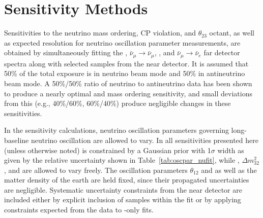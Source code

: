 \section{Sensitivity Methods}
\label{sec:physics-lbnosc-sens}




Sensitivities to the neutrino mass ordering, CP violation, and $\theta_{23}$ octant, as well as expected resolution for neutrino oscillation parameter measurements, are obtained by simultaneously fitting the \numutonumu, $\bar{\nu}_\mu \rightarrow \bar{\nu}_\mu$, \numutonue, and $\bar{\nu}_\mu \rightarrow \bar{\nu}_e$ far detector spectra along with selected samples from the near detector.  It is assumed that 50\% of the total exposure is in neutrino beam mode and 50\% in antineutrino beam mode.  A 50\%/50\% ratio of neutrino to antineutrino data has been shown to produce a nearly optimal \deltacp and mass ordering sensitivity, and small deviations from this (e.g., 40\%/60\%, 60\%/40\%) produce negligible changes in these sensitivities. %

In the sensitivity calculations, neutrino oscillation parameters governing long-baseline neutrino oscillation are allowed to vary. In all sensitivities presented here (unless otherwise noted)  is constrained by a Gaussian prior with 1$\sigma$ width as given by the relative uncertainty shown in Table~\ref{tab:oscpar_nufit}, while , $\Delta m^{2}_{32}$, and \deltacp are allowed to vary freely. The oscillation parameters $\theta_{12}$ and  as well as the matter density of the earth are held fixed, since their propagated uncertainties are negligible. Systematic uncertainty constraints from the near detector are included either by explicit inclusion of  samples within the fit or by applying constraints expected from the  data to -only fits.

